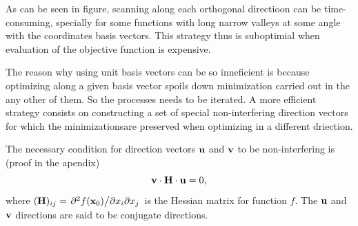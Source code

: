 As can be seen in figure, scanning along each orthogonal directioon can be time-consuming, specially for some functions with long narrow valleys at some angle with the coordinates basis vectors. This strategy thus is suboptimial when evaluation of the objective function is expensive.

The reason why using unit basis vectors can be so inneficient is because optimizing along a given basis vector spoils down minimization carried out in the any other of them. So the processes needs to be iterated. A more efficient strategy consists on constructing a set of special non-interfering direction vectors for which the minimizationsare preserved when optimizing in a different driection.

The necessary condition for direction vectors $\vb{u}$ and $\vb{v}$ to be non-interfering is (proof in the apendix)
\begin{equation}
    \vb{v}\cdot\vb{H}\cdot\vb{u}=0,
\end{equation}
where $(\vb{H})_{ij} = \pdv*{f(\vb{x}_0)}{x_i}{x_j}$ is the Hessian matrix for function $f$. The $\vb{u}$ and $\vb{v}$ directions are said to be conjugate directions.

